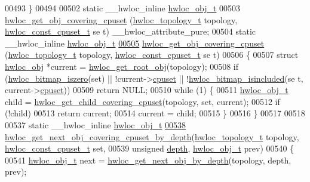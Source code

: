 \begin{DoxyCode}
{{00493 \}
00494 
00502 \textcolor{keyword}{static} \_\_hwloc\_inline \hyperlink{a00016}{hwloc_obj_t}
00503 \hyperlink{a00055_ga68300dd0ee9c36a7a90f275a59e9af28}{hwloc_get_obj_covering_cpuset} (\hyperlink{a00039_ga9d1e76ee15a7dee158b786c30b6a6e38}{hwloc_topology_t} topology, \hyperlink{a00040_ga1f784433e9b606261f62d1134f6a3b25}{hwloc_const_cpuset_t} \textcolor{keyword}{se
      t}) \_\_hwloc\_attribute\_pure;
00504 static \_\_hwloc\_inline \hyperlink{a00016}{hwloc_obj_t}
\hypertarget{a00031_source_l00505}{}\hyperlink{a00055_ga68300dd0ee9c36a7a90f275a59e9af28}{00505} \hyperlink{a00055_ga68300dd0ee9c36a7a90f275a59e9af28}{hwloc_get_obj_covering_cpuset} (\hyperlink{a00039_ga9d1e76ee15a7dee158b786c30b6a6e38}{hwloc_topology_t} topology, \hyperlink{a00040_ga1f784433e9b606261f62d1134f6a3b25}{hwloc_const_cpuset_t} se
      t)
00506 \{
00507   \textcolor{keyword}{struct }\hyperlink{a00016}{hwloc_obj} *current = \hyperlink{a00053_gadbf58f6e187efbdb3cd9a8e30311b7d7}{hwloc_get_root_obj}(topology);
00508   \textcolor{keywordflow}{if} (\hyperlink{a00065_gaa94fed35d2a598bc4a8657b6955b7bf5}{hwloc_bitmap_iszero}(\textcolor{keyword}{set}) || !current->\hyperlink{a00016_a67925e0f2c47f50408fbdb9bddd0790f}{cpuset} || !\hyperlink{a00065_gaae29e14a926c198e8f91e6e4790621e7}{hwloc_bitmap_isincluded}(\textcolor{keyword}{se
      t}, current->\hyperlink{a00016_a67925e0f2c47f50408fbdb9bddd0790f}{cpuset}))
00509     \textcolor{keywordflow}{return} NULL;
00510   \textcolor{keywordflow}{while} (1) \{
00511     \hyperlink{a00016}{hwloc_obj_t} child = \hyperlink{a00055_ga69a22cc76c88115aee7b7e6fc53fca7d}{hwloc_get_child_covering_cpuset}(topology, \textcolor{keyword}{set}, current);
00512     \textcolor{keywordflow}{if} (!child)
00513       \textcolor{keywordflow}{return} current;
00514     current = child;
00515   \}
00516 \}
00517 
00518 
00537 \textcolor{keyword}{static} \_\_hwloc\_inline \hyperlink{a00016}{hwloc_obj_t}
\hypertarget{a00031_source_l00538}{}\hyperlink{a00056_ga2f9a4ec15e9cfae8c21501257a51ce5b}{00538} \hyperlink{a00056_ga2f9a4ec15e9cfae8c21501257a51ce5b}{hwloc_get_next_obj_covering_cpuset_by_depth}(\hyperlink{a00039_ga9d1e76ee15a7dee158b786c30b6a6e38}{hwloc_topology_t} topology, 
      \hyperlink{a00040_ga1f784433e9b606261f62d1134f6a3b25}{hwloc_const_cpuset_t} \textcolor{keyword}{set},
00539                                             \textcolor{keywordtype}{unsigned} \hyperlink{a00016_a9d82690370275d42d652eccdea5d3ee5}{depth}, \hyperlink{a00016}{hwloc_obj_t} prev)
00540 \{
00541   \hyperlink{a00016}{hwloc_obj_t} next = \hyperlink{a00053_gab7c1dce3f42ece5bfa621e87cf332418}{hwloc_get_next_obj_by_depth}(topology, depth, prev);
}}
\end{DoxyCode}
